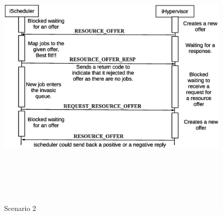 \documentclass[a4paper, 12pt]{article}
\begin{document}
\clearpage
\begin{figure}[h]
\centering
\includegraphics[width=1.0\textwidth, height=130mm]{./figures2.eps}
\caption{Scenario 2}
\label{fig:Seq2}
\end{figure}
\clearpage
\end{document}
